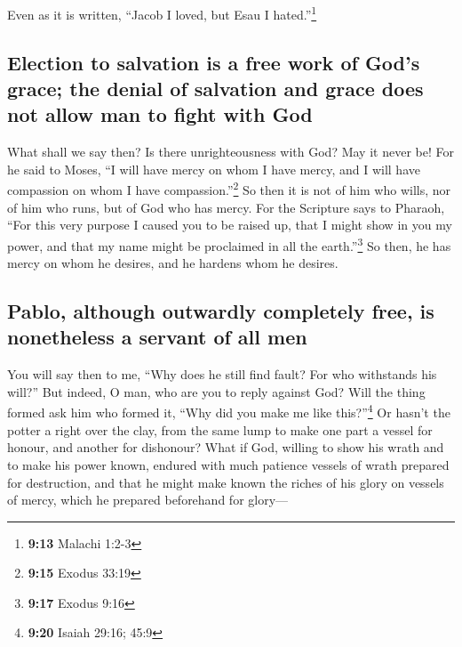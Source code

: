  Even as it is written, ``Jacob I loved, but Esau I
hated.''\footnote{\textbf{9:13} Malachi 1:2-3}

\hypertarget{election-to-salvation-is-a-free-work-of-gods-grace-the-denial-of-salvation-and-grace-does-not-allow-man-to-fight-with-god}{%
\subsection{Election to salvation is a free work of God's grace; the
denial of salvation and grace does not allow man to fight with
God}\label{election-to-salvation-is-a-free-work-of-gods-grace-the-denial-of-salvation-and-grace-does-not-allow-man-to-fight-with-god}}

 What shall we say then? Is there unrighteousness with
God? May it never be!  For he said to Moses, ``I will
have mercy on whom I have mercy, and I will have compassion on whom I
have compassion.''\footnote{\textbf{9:15} Exodus 33:19} 
So then it is not of him who wills, nor of him who runs, but of God who
has mercy.  For the Scripture says to Pharaoh, ``For this
very purpose I caused you to be raised up, that I might show in you my
power, and that my name might be proclaimed in all the
earth.''\footnote{\textbf{9:17} Exodus 9:16}  So then, he
has mercy on whom he desires, and he hardens whom he desires.

\hypertarget{pablo-although-outwardly-completely-free-is-nonetheless-a-servant-of-all-men}{%
\subsection{Pablo, although outwardly completely free, is nonetheless a
servant of all
men}\label{pablo-although-outwardly-completely-free-is-nonetheless-a-servant-of-all-men}}

 You will say then to me, ``Why does he still find fault?
For who withstands his will?''  But indeed, O man, who
are you to reply against God? Will the thing formed ask him who formed
it, ``Why did you make me like this?''\footnote{\textbf{9:20} Isaiah
  29:16; 45:9}  Or hasn't the potter a right over the
clay, from the same lump to make one part a vessel for honour, and
another for dishonour?  What if God, willing to show his
wrath and to make his power known, endured with much patience vessels of
wrath prepared for destruction,  and that he might make
known the riches of his glory on vessels of mercy, which he prepared
beforehand for glory---

